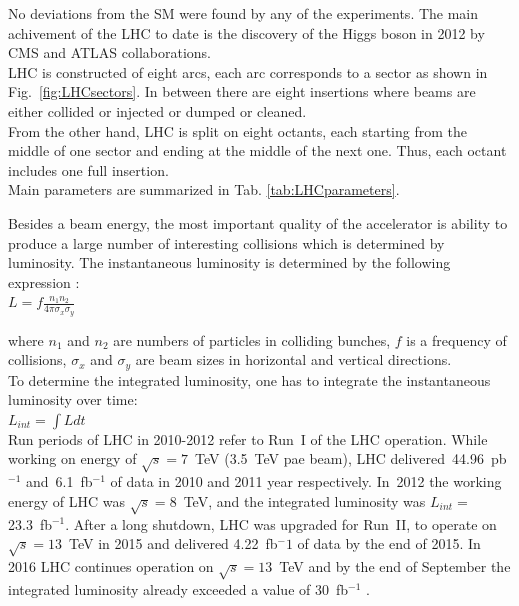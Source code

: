 No deviations from the SM were found by any of the experiments. The main achivement of the LHC to date is the discovery of the Higgs boson in 2012 by CMS \cite{ref_HiggsPaperCMS} and ATLAS \cite{ref_HiggsPaperATLAS} collaborations.\\


LHC is constructed of eight arcs, each arc corresponds to a sector as shown in Fig.~\ref{fig:LHCsectors}. In between there are eight insertions where beams are either collided or injected or dumped or cleaned.\\

From the other hand, LHC is split on eight octants, each starting from the middle of one sector and ending at the middle of the next one. Thus, each octant includes one full insertion.\\ 

Main parameters are summarized in Tab. \ref{tab:LHCparameters}.

Besides a beam energy, the most important quality of the accelerator is ability to produce a large number of interesting collisions which is determined by luminosity. The instantaneous luminosity is determined by the following expression \cite{ref_PDG}:\\

$L = f \frac{n_1 n_2}{4 \pi \sigma_x \sigma_y}$

where $n_1$ and $n_2$ are numbers of particles in colliding bunches, $f$ is a frequency of collisions, $\sigma_x$ and $\sigma_y$ are beam sizes in horizontal and vertical directions. \\

To determine the integrated luminosity, one has to integrate the instantaneous luminosity over time:\\

$L_{int}=\int L dt$\\

Run periods of LHC in 2010-2012 refer to Run~I of the LHC operation. While working on energy of $\sqrt{s}=7$~TeV (3.5~TeV pae beam), LHC delivered~44.96~pb$^{-1}$ and~6.1~fb$^{-1}$ of data in 2010 and 2011 year respectively. In~2012 the working energy of LHC was $\sqrt{s}=8$~TeV, and the integrated luminosity was $L_{int}=$23.3~fb$^{-1}$.  After a long shutdown, LHC was upgraded for Run~II, to operate on $\sqrt{s}=13$~TeV in 2015 and delivered 4.22~fb$^-1$ of data by the end of 2015. In 2016 LHC continues operation on $\sqrt{s}=13$~TeV and by the end of September the integrated luminosity already exceeded a value of 30~fb$^{-1}$ \cite{ref_LHClumi_twiki}.\\ 

